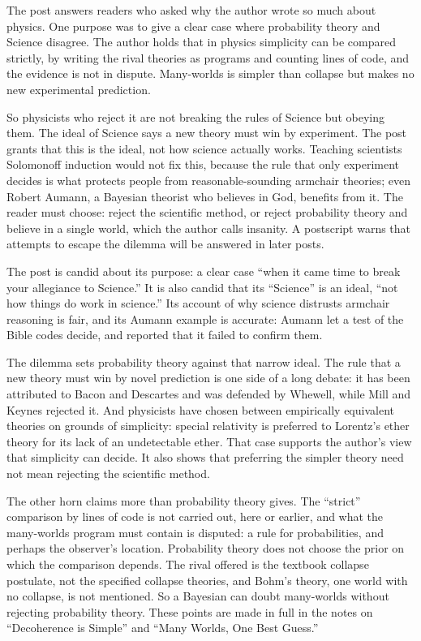 \begin{afterword}
\summaryhead

The post answers readers who asked why the author wrote so much about physics. One purpose was to give a clear case where probability theory and Science disagree. The author holds that in physics simplicity can be compared strictly, by writing the rival theories as programs and counting lines of code, and the evidence is not in dispute. Many-worlds is simpler than collapse but makes no new experimental prediction.

So physicists who reject it are not breaking the rules of Science but obeying them. The ideal of Science says a new theory must win by experiment. The post grants that this is the ideal, not how science actually works. Teaching scientists Solomonoff induction would not fix this, because the rule that only experiment decides is what protects people from reasonable-sounding armchair theories; even Robert Aumann, a Bayesian theorist who believes in God, benefits from it. The reader must choose: reject the scientific method, or reject probability theory and believe in a single world, which the author calls insanity. A postscript warns that attempts to escape the dilemma will be answered in later posts.

\responsehead

The post is candid about its purpose: a clear case ``when it came time to break your allegiance to Science.'' It is also candid that its ``Science'' is an ideal, ``not how things do work in science.'' Its account of why science distrusts armchair reasoning is fair, and its Aumann example is accurate: Aumann let a test of the Bible codes decide, and reported that it failed to confirm them.

The dilemma sets probability theory against that narrow ideal. The rule that a new theory must win by novel prediction is one side of a long debate: it has been attributed to Bacon and Descartes and was defended by Whewell, while Mill and Keynes rejected it. And physicists have chosen between empirically equivalent theories on grounds of simplicity: special relativity is preferred to Lorentz's ether theory for its lack of an undetectable ether. That case supports the author's view that simplicity can decide. It also shows that preferring the simpler theory need not mean rejecting the scientific method.

The other horn claims more than probability theory gives. The ``strict'' comparison by lines of code is not carried out, here or earlier, and what the many-worlds program must contain is disputed: a rule for probabilities, and perhaps the observer's location. Probability theory does not choose the prior on which the comparison depends. The rival offered is the textbook collapse postulate, not the specified collapse theories, and Bohm's theory, one world with no collapse, is not mentioned. So a Bayesian can doubt many-worlds without rejecting probability theory. These points are made in full in the notes on ``Decoherence is Simple'' and ``Many Worlds, One Best Guess.''


\end{afterword}
